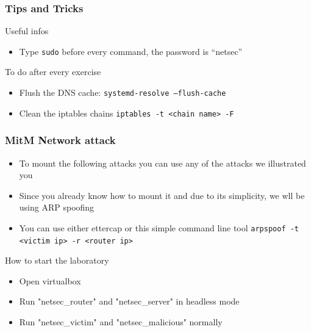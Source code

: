 \documentclass{beamer}
\begin{document}
\begin{frame}
\frametitle{Tips and Tricks}

\begin{block}{Useful infos}
  \begin{itemize}
    \item Type \texttt{sudo} before every command, the password  is ``netsec''
  \end{itemize}
\end{block}
\begin{block}{To do after every exercise}
\begin{itemize}
  \item Flush the DNS cache: \texttt{systemd-resolve --flush-cache}
  \item Clean the iptables chains \texttt{iptables -t <chain name> -F}
\end{itemize}
\end{block}

\end{frame}



\begin{frame}
\frametitle{MitM Network attack}
\begin{block}{}
  \begin{itemize}
    \item To mount the following attacks you can use any of the attacks we illustrated you
    \item Since you already know how to mount it and due to its simplicity, we wll be using ARP spoofing
  \end{itemize}
\end{block}

\begin{block}{}
  \begin{itemize}
    \item You can use either ettercap or this simple command line tool
    \texttt{arpspoof -t <victim ip> -r <router ip>}
  \end{itemize}
\end{block}
\end{frame}


\begin{frame}{How to start the laboratory}
  \begin{block}{}
    \begin{itemize}
      \item Open virtualbox
      \item Run "netsec\_router" and "netsec\_server" in headless mode
      \item Run "netsec\_victim" and "netsec\_malicious" normally
    \end{itemize}
  \end{block}
\end{frame}
\end{document}

